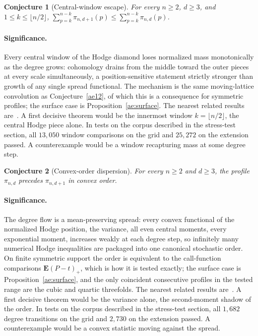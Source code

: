 \documentclass[11pt]{article}
\newtheorem{conjecture}{Conjecture}
\theoremstyle{definition}
\begin{document}
\begin{conjecture}[Central-window escape]\label{ae13}
For every $n\ge2$, $d\ge3$, and $1\le k\le\lfloor n/2\rfloor$, $\sum_{p=k}^{n-k}\pi_{n,d+1}(p)\le\sum_{p=k}^{n-k}\pi_{n,d}(p)$.
\end{conjecture}

\paragraph{Significance.}
Every central window of the Hodge diamond loses normalized mass monotonically as the degree grows: cohomology drains from the middle toward the outer pieces at every scale simultaneously, a position-sensitive statement strictly stronger than growth of any single spread functional.  The mechanism is the same moving-lattice convolution as Conjecture~\ref{ae12}, of which this is a consequence for symmetric profiles; the surface case is Proposition~\ref{ae:surface}.  The nearest related results are~\cite{Gri69,LS25}.  A first decisive theorem would be the innermost window $k=\lfloor n/2\rfloor$, the central Hodge piece alone.  In tests on the corpus described in the stress-test section, all $13{,}050$ window comparisons on the grid and $25{,}272$ on the extension passed.  A counterexample would be a window recapturing mass at some degree step.

\begin{conjecture}[Convex-order dispersion]\label{ae14}
For every $n\ge2$ and $d\ge3$, the profile $\pi_{n,d}$ precedes $\pi_{n,d+1}$ in convex order.
\end{conjecture}

\paragraph{Significance.}
The degree flow is a mean-preserving spread: every convex functional of the normalized Hodge position, the variance, all even central moments, every exponential moment, increases weakly at each degree step, so infinitely many numerical Hodge inequalities are packaged into one canonical stochastic order.  On finite symmetric support the order is equivalent to the call-function comparisons $\mathbf E(P-t)_+$, which is how it is tested exactly; the surface case is Proposition~\ref{ae:surface}, and the only coincident consecutive profiles in the tested range are the cubic and quartic threefolds.  The nearest related results are~\cite{Gri69,DK86}.  A first decisive theorem would be the variance alone, the second-moment shadow of the order.  In tests on the corpus described in the stress-test section, all $1{,}682$ degree transitions on the grid and $2{,}730$ on the extension passed.  A counterexample would be a convex statistic moving against the spread.
\end{document}
